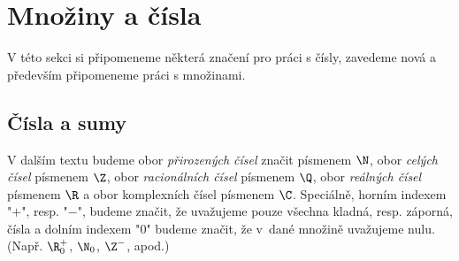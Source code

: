 \section{Množiny a čísla}\label{sec:mnoziny_a_cisla}

V této sekci si připomeneme některá značení pro práci s čísly, zavedeme nová a především připomeneme práci s množinami.

\subsection{Čísla a sumy}

\begin{convention}
    V dalším textu budeme obor \emph{přirozených čísel} značit písmenem $\N$, obor \emph{celých čísel} písmenem $\Z$, obor \emph{racionálních čísel} písmenem $\Q$, obor \emph{reálných čísel} písmenem $\R$ a obor komplexních čísel písmenem $\C$. Speciálně, horním indexem "$+$", resp. "$-$", budeme značit, že uvažujeme pouze všechna kladná, resp. záporná, čísla a dolním indexem "$0$" budeme značit, že v~dané množině uvažujeme nulu. (Např. $\R_0^+$, $\N_0$, $\Z^-$, apod.) 
\end{convention}

